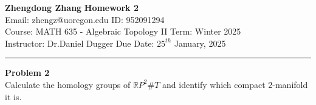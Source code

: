 \documentclass[a4paper, 12pt]{article}
\newenvironment{problem}[2][Problem]
    { \begin{mdframed}[backgroundcolor=gray!20] \textbf{#1 #2} \\}
    {  \end{mdframed}}
\begin{document}
\noindent
\large\textbf{Zhengdong Zhang} \hfill \textbf{Homework 2}   \\
Email: zhengz@uoregon.edu \hfill ID: 952091294 \\
\normalsize Course: MATH 635 - Algebraic Topology II \hfill Term: Winter 2025\\
Instructor: Dr.Daniel Dugger \hfill Due Date: $25^{th}$ January, 2025 \\
\noindent\rule{7in}{2.8pt}


\begin{problem}{2}
Calculate the homology groups of \(\mathbb{R}P^2\# T\) and identify which compact 2-manifold it is.
\end{problem}
\end{document}
